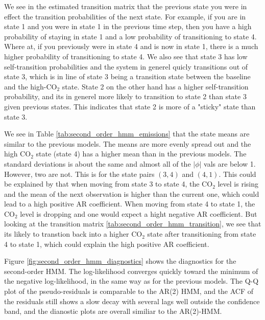 
We see in the estimated transition matrix that the previous state
you were in effect the transition probabilities of the next state.
For example, if you are in state 1 and you were in state 1 in the previous time step, 
then you have a high probability of staying in state 1 and a low probability of transitioning to state 4.
Where at, if you previously were in state 4 and is now in state 1, there is a much higher 
probability of transitioning to state 4. 
We also see that state 3 has low self-transition probabilities and 
the system in generel quicly transitions out of state 3, which is in line of state 3
being a transition state between the baseline and the high-CO$_2$ state. 
State 2 on the other hand has a higher self-transition probability, and 
its in generel more likely to transition to state 2 than state 3 given previous states. 
This indicates that state 2 is more of a "sticky" state than state 3. 



We see in Table \ref{tab:second_order_hmm_emissions} that the state means are similar to the previous models. 
The means are more evenly spread out and the high CO$_2$ state (state 4) has a higher mean than in the previous models. 
The standard deviations is about the same and almost all of the $|\phi|$ vals
are below 1. However, two are not. This is for the state pairs
$(3,4)$ and $(4,1)$. This could be explained by that when moving from
state 3 to state 4, the CO$_2$ level is rising and the mean of the next observation is higher than the current one, which could lead to a high positive AR coefficient. 
When moving from state 4 to state 1, the CO$_2$ level is 
dropping and one would expect a hight negative AR coefficient.
But looking at the transition matrix \ref{tab:second_order_hmm_transition}, we see
that its likely to transtion back into a higher CO$_2$ state after transitioning 
from state 4 to state 1, which could explain the high positive AR coefficient.



Figure \ref{fig:second_order_hmm_diagnostics} shows the diagnostics for the
second-order HMM. The log-likelihood converges quickly toward the minimum of
the negative log-likelihood, in the same way as for the previous models. The
Q-Q plot of the pseudo-residuals is comparable to the AR(2) HMM, and the
ACF of the residuals still shows a slow decay with several lags well outside
the confidence band, and the dianostic plots are overall similiar to the AR(2)-HMM. 

